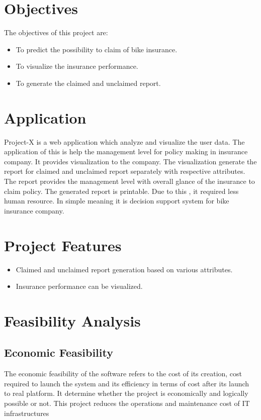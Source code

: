 \section{Objectives}\label{sec:obj}
The objectives of this project are:
\begin{itemize}
\item To predict the possibility to claim of bike insurance.
\item To visualize the insurance performance. 
\item To generate the claimed and unclaimed report.
\end{itemize}

\section{Application}
Project-X is a web application which analyze and visualize the user data. The application of this is help the  management level for policy making in insurance company. It provides visualization to the company. The visualization generate the report for claimed and unclaimed report separately with respective attributes. The report provides the management level with overall glance of the insurance to claim policy. The generated report is printable. Due to this , it required less human resource. In simple meaning it is decision support system for bike insurance company.

\section{Project Features} \label{sec:feat}
\begin{itemize}
\item Claimed and unclaimed report generation based on various attributes.
\item Insurance performance can be visualized. 
\end{itemize}






\section{Feasibility Analysis}

\subsection{Economic Feasibility}

The economic feasibility of the software refers to the cost of its creation, cost required
to launch the system and its efficiency in terms of cost after its launch to real platform.
It determine whether the project is economically and logically possible or not.  This
project reduces the operations and maintenance cost of IT infrastructures

